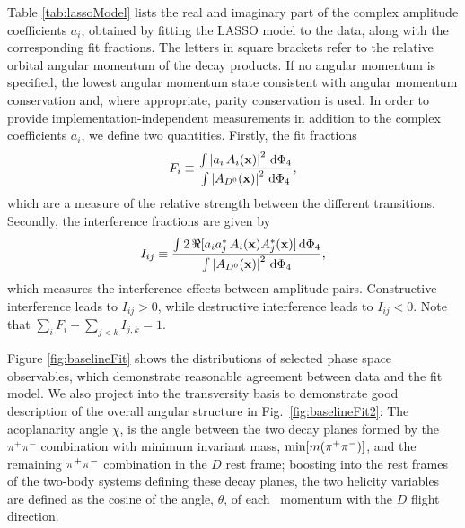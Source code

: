 Table \ref{tab:lassoModel} 
lists the real and imaginary part of the complex amplitude coefficients $a_{i}$, 
obtained by fitting the LASSO model to the data,
along with the corresponding fit fractions. 
The letters in square brackets refer to the relative orbital angular momentum of the decay products. 
If no angular momentum is specified, the lowest angular momentum state consistent with angular momentum conservation and, where appropriate, parity conservation is used.
In order to provide implementation-independent measurements in addition to the complex coefficients $a_i$, we define two quantities. Firstly, the fit fractions
\begin{equation}
\label{eq:DefineFitFractions}
	F_{i} \equiv \frac{\int \left\vert   a_{i} \, A_{i}(\mathbf{x}) \right\vert^{2} \, \text{d}\Phi_{4} }
	{\int \left\vert  A_{{{D}^0}}(\mathbf{x}) \right\vert^{2} \, \text{d}\Phi_{4}}, 
\end{equation}
which are a measure of the relative strength between the different transitions. Secondly, the interference fractions are given by
\begin{equation}
\label{eq:DefineInterferenceFractions}
	I_{ij} \equiv \frac{\int  2\,\Re[a_{i}a^*_{j} \, A_{i}(\mathbf{x}) A^*_{j}(\mathbf{x}) ] \, \text{d}\Phi_{4} }
	{\int \left\vert  A_{{{D}^0}}(\mathbf{x}) \right\vert^{2} \, \text{d}\Phi_{4}} ,
\end{equation}
which measures the interference effects between amplitude pairs. Constructive interference leads to $I_{ij} > 0$, while destructive interference leads to $I_{ij} < 0$. Note that $\sum_i F_{i} + \sum_{j<k} I_{j,k} = 1$.

Figure \ref{fig:baselineFit} shows the distributions of 
selected phase space observables, which demonstrate 
reasonable agreement between data and the fit model. 
We also project into the transversity basis to demonstrate good description of the overall angular structure in
Fig.~\ref{fig:baselineFit2}: 
The acoplanarity angle 
${\chi}$, is the angle between the two decay planes formed by 
the $\pi^+\pi^-$ combination with minimum invariant mass, ${\rm min}[m(\pi^+\pi^-)]$,  
and the remaining ${{\pi}^+} {{\pi}^-}$ combination
in the $D$ rest frame; boosting into the rest frames of the two-body systems defining these decay planes,
the two helicity variables 
are defined as the cosine of the angle, ${\theta}$, 
of each \pip\ momentum with the $D$ flight direction.

